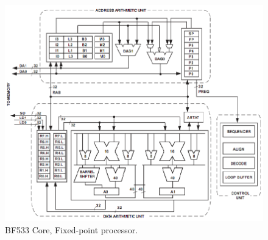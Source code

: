 \begin{figure} [H]
	\centering
	\includegraphics[width=0.85\linewidth]{graphics/7.png}
	\caption{BF533 Core, Fixed-point processor.}
	\label{fig:7}
\end{figure}
